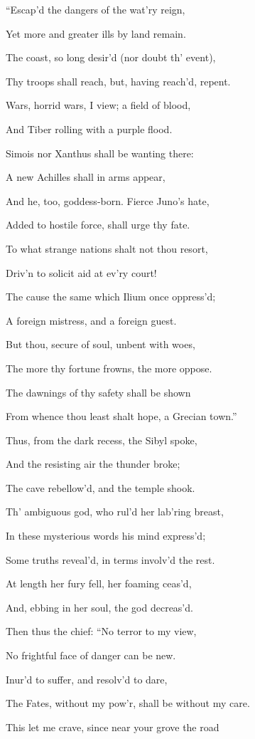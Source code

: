 “Escap’d the dangers of the wat’ry reign,

Yet more and greater ills by land remain.

The coast, so long desir’d (nor doubt th’ event),

Thy troops shall reach, but, having reach’d, repent.

Wars, horrid wars, I view; a field of blood,

And Tiber rolling with a purple flood.

Simois nor Xanthus shall be wanting there:

A new Achilles shall in arms appear,

And he, too, goddess-born. Fierce Juno’s hate,

Added to hostile force, shall urge thy fate.

To what strange nations shalt not thou resort,

Driv’n to solicit aid at ev’ry court!

The cause the same which Ilium once oppress’d;

A foreign mistress, and a foreign guest.

But thou, secure of soul, unbent with woes,

The more thy fortune frowns, the more oppose.

The dawnings of thy safety shall be shown

From whence thou least shalt hope, a Grecian town.”

Thus, from the dark recess, the Sibyl spoke,

And the resisting air the thunder broke;

The cave rebellow’d, and the temple shook.

Th’ ambiguous god, who rul’d her lab’ring breast,

In these mysterious words his mind express’d;

Some truths reveal’d, in terms involv’d the rest.

At length her fury fell, her foaming ceas’d,

And, ebbing in her soul, the god decreas’d.

Then thus the chief: “No terror to my view,

No frightful face of danger can be new.

Inur’d to suffer, and resolv’d to dare,

The Fates, without my pow’r, shall be without my care.

This let me crave, since near your grove the road

